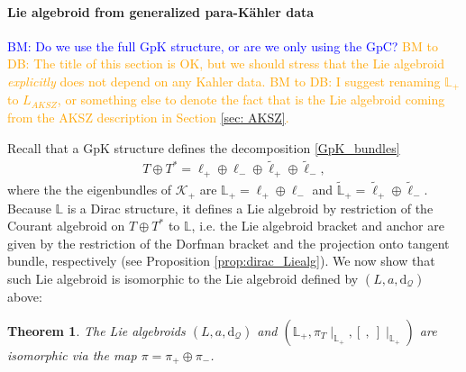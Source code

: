 \documentclass{article}
\newcommand{\TT}{{T\oplus T^*}}
\newcommand{\KK}{\mathcal{K}}
\newcommand{\QQ}{\mathcal{Q}}
\newcommand{\rd}{\mathrm{d}}
\newcommand{\Lb}{\mathbb{L}}
\newcommand{\ellt}{{\tl{\ell}}}
\newcommand{\brac}{[\ ,\ ]}
\newcommand{\wtl}{\widetilde}
\def\tl{\tilde}
\newtheorem{theorem}{Theorem}[section]
\theoremstyle{definition}
\theoremstyle{remark}
\def\brian{\textcolor{blue}{BM: }\textcolor{blue}}
\def\btd{\textcolor{orange}{BM to DB: }\textcolor{orange}}
\begin{document}
\paragraph{Lie algebroid from generalized para-K\"ahler data}

\brian{Do we use the full GpK structure, or are we only using the GpC?}
\btd{The title of this section is OK, but we should stress that the Lie algebroid {\em explicitly} does not depend on any Kahler data.}
\btd{I suggest renaming $\Lb_+$ to $L_{AKSZ}$, or something else to denote the fact that is the Lie algebroid coming from the AKSZ description in Section \ref{sec: AKSZ}.}

Recall that a GpK structure defines the decomposition \eqref{GpK_bundles}
\begin{align*}
\TT=\ell_+\oplus\ell_-\oplus \ellt_+\oplus \ellt_-,
\end{align*}
where the the eigenbundles of $\KK_+$ are $\Lb_+=\ell_+\oplus\ell_-$ and $\wtl{\Lb}_+=\ellt_+\oplus \ellt_-$. Because $\Lb$ is a Dirac structure, it defines a Lie algebroid by restriction of the Courant algebroid on $\TT$ to $\Lb$, i.e. the Lie algebroid bracket and anchor are given by the restriction of the Dorfman bracket and the projection onto tangent bundle, respectively (see Proposition \ref{prop:dirac_Liealg}). We now show that such Lie algebroid is isomorphic to the Lie algebroid defined by $(L,a,\rd_\QQ)$ above:
\begin{theorem}
The Lie algebroids $(L,a,\rd_\QQ)$ and $(\Lb_+,\pi_T\!\!\mid_{\Lb_+},\brac\!\!\mid_{\Lb_+})$ are isomorphic via the map $\pi=\pi_+\oplus \pi_-$.
\end{theorem}
\end{document}
